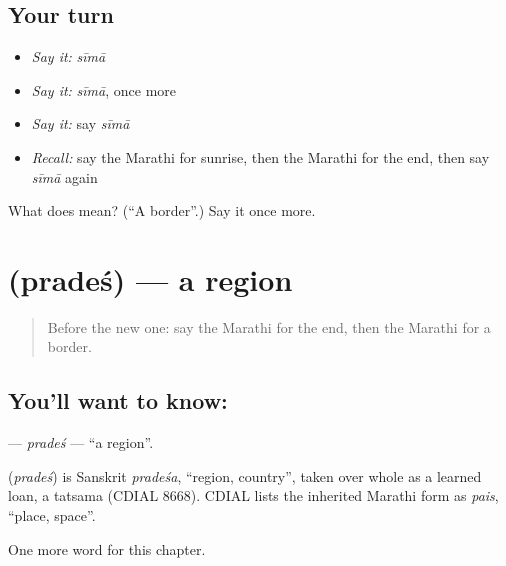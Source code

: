 \subsection*{Your turn}
\begin{itemize}
\raggedright
  \item \emph{Say it:} \emph{sīmā}
  \item \emph{Say it:} \emph{sīmā}, once more
  \item \emph{Say it:} say \emph{sīmā}
  \item \emph{Recall:} say the Marathi for sunrise, then the Marathi for the end, then say \emph{sīmā} again
\end{itemize}

\begin{tcolorbox}[breakable,colback=teal!4,colframe=teal!35!black,title={Before you move on}]
What does  mean? (\textquotedblleft{}A border\textquotedblright{}.) Say it once more.
\end{tcolorbox}
\section[\texorpdfstring{\mr{प्रदेश} (pradeś)}{प्रदेश (pradeś)}]{ (pradeś) — a region}

\label{lesson:MR-C202-prades}



\begin{quote}
Before the new one: say the Marathi for the end, then the Marathi for a border.
\end{quote}

\subsection*{You'll want to know: }
\textbf{} — \emph{pradeś} — \textquotedblleft{}a region\textquotedblright{}.

\begin{cousinweb}
\textbf{} (\emph{pradeś}) is Sanskrit \emph{pradeśa}, \textquotedblleft{}region, country\textquotedblright{}, taken over whole as a learned loan, a tatsama (CDIAL 8668). CDIAL lists the inherited Marathi form as \emph{pais}, \textquotedblleft{}place, space\textquotedblright{}.
\end{cousinweb}

\begin{grammarlens}[title={What you've built}]
One more word for this chapter.
\end{grammarlens}

